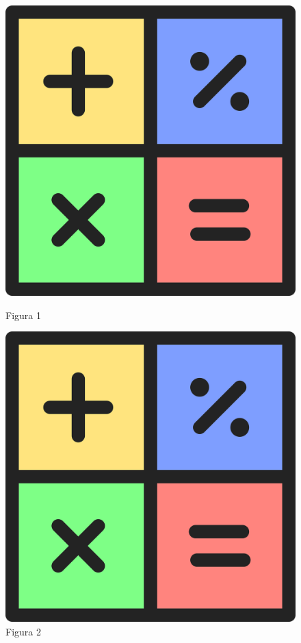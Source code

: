 \documentclass[12pt,a4paper]{article}
\begin{document}
\begin{figure}[H]
  \centering
  \begin{minipage}{0.45\textwidth}
    \centering
    \includegraphics[width=\textwidth]{figura}
    \caption{Figura 1}
    \label{fig:figura1}
  \end{minipage}
  \begin{minipage}{0.45\textwidth}
    \centering
    \includegraphics[width=\textwidth]{figura}
    \caption{Figura 2}
    \label{fig:figura2}
  \end{minipage}
\end{figure}
\end{document}
